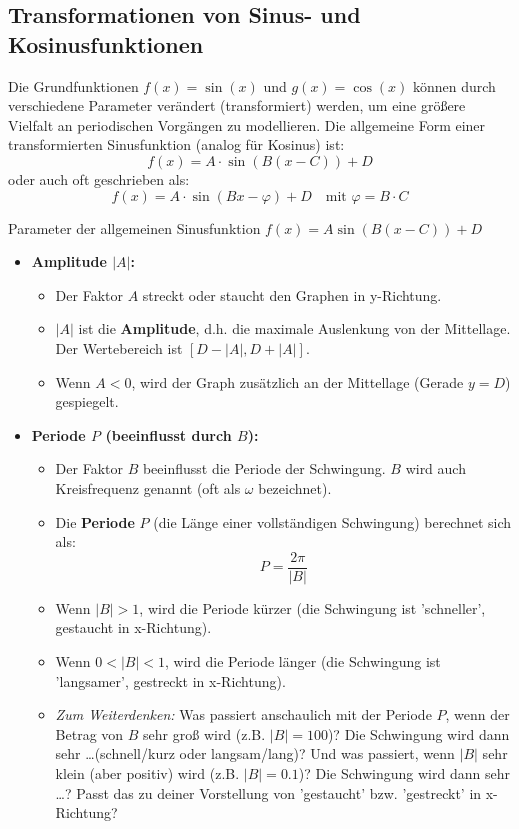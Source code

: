\subsection{Transformationen von Sinus- und Kosinusfunktionen}
\label{subsec:trafo_sincos}

Die Grundfunktionen $f(x)=\sin(x)$ und $g(x)=\cos(x)$ können durch verschiedene Parameter verändert (transformiert) werden, um eine größere Vielfalt an periodischen Vorgängen zu modellieren. Die allgemeine Form einer transformierten Sinusfunktion (analog für Kosinus) ist:
\[ f(x) = A \cdot \sin(B(x-C)) + D \]
oder auch oft geschrieben als:
\[ f(x) = A \cdot \sin(Bx - \varphi) + D \quad \text{mit } \varphi = B \cdot C \]

\begin{merksatzumgebung}{Parameter der allgemeinen Sinusfunktion $f(x) = A \sin(B(x-C)) + D$}
\begin{itemize}
    \item \textbf{Amplitude $|A|$:}
        \begin{itemize}
            \item Der Faktor $A$ streckt oder staucht den Graphen in y-Richtung.
            \item $|A|$ ist die \textbf{Amplitude}, d.h. die maximale Auslenkung von der Mittellage. Der Wertebereich ist $[D-|A|, D+|A|]$.
            \item Wenn $A < 0$, wird der Graph zusätzlich an der Mittellage (Gerade $y=D$) gespiegelt.
        \end{itemize}
    \item \textbf{Periode $P$ (beeinflusst durch $B$):}
        \begin{itemize}
            \item Der Faktor $B$ beeinflusst die Periode der Schwingung. $B$ wird auch Kreisfrequenz genannt (oft als $\omega$ bezeichnet).
            \item Die \textbf{Periode} $P$ (die Länge einer vollständigen Schwingung) berechnet sich als:
            \[ P = \frac{2\pi}{|B|} \]
            \item Wenn $|B|>1$, wird die Periode kürzer (die Schwingung ist 'schneller', gestaucht in x-Richtung).
            \item Wenn $0<|B|<1$, wird die Periode länger (die Schwingung ist 'langsamer', gestreckt in x-Richtung).
            \item \textit{Zum Weiterdenken:} Was passiert anschaulich mit der Periode $P$, wenn der Betrag von $B$ sehr groß wird (z.B. $|B|=100$)? Die Schwingung wird dann sehr \dots (schnell/kurz oder langsam/lang)? Und was passiert, wenn $|B|$ sehr klein (aber positiv) wird (z.B. $|B|=0.1$)? Die Schwingung wird dann sehr \dots? Passt das zu deiner Vorstellung von 'gestaucht' bzw. 'gestreckt' in x-Richtung?

\end{itemize}
\end{itemize}
\end{merksatzumgebung}
